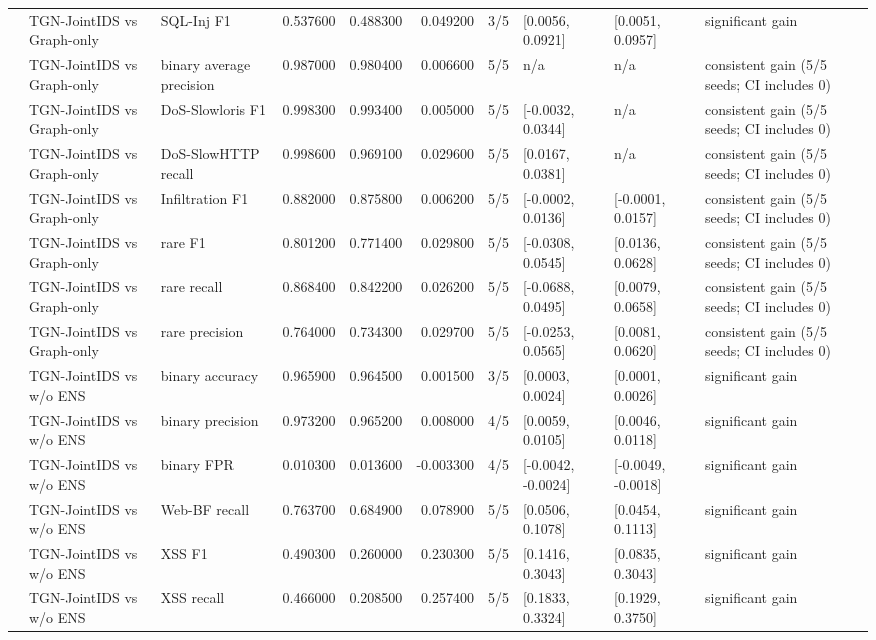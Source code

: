 \begin{table}
\begin{tabular}{lllrrrllll}
 & TGN-JointIDS vs Graph-only & SQL-Inj F1 & 0.537600 & 0.488300 & 0.049200 & 3/5 & [0.0056, 0.0921] & [0.0051, 0.0957] & significant gain \\
 & TGN-JointIDS vs Graph-only & binary average precision & 0.987000 & 0.980400 & 0.006600 & 5/5 & n/a & n/a & consistent gain (5/5 seeds; CI includes 0) \\
 & TGN-JointIDS vs Graph-only & DoS-Slowloris F1 & 0.998300 & 0.993400 & 0.005000 & 5/5 & [-0.0032, 0.0344] & n/a & consistent gain (5/5 seeds; CI includes 0) \\
 & TGN-JointIDS vs Graph-only & DoS-SlowHTTP recall & 0.998600 & 0.969100 & 0.029600 & 5/5 & [0.0167, 0.0381] & n/a & consistent gain (5/5 seeds; CI includes 0) \\
 & TGN-JointIDS vs Graph-only & Infiltration F1 & 0.882000 & 0.875800 & 0.006200 & 5/5 & [-0.0002, 0.0136] & [-0.0001, 0.0157] & consistent gain (5/5 seeds; CI includes 0) \\
 & TGN-JointIDS vs Graph-only & rare F1 & 0.801200 & 0.771400 & 0.029800 & 5/5 & [-0.0308, 0.0545] & [0.0136, 0.0628] & consistent gain (5/5 seeds; CI includes 0) \\
 & TGN-JointIDS vs Graph-only & rare recall & 0.868400 & 0.842200 & 0.026200 & 5/5 & [-0.0688, 0.0495] & [0.0079, 0.0658] & consistent gain (5/5 seeds; CI includes 0) \\
 & TGN-JointIDS vs Graph-only & rare precision & 0.764000 & 0.734300 & 0.029700 & 5/5 & [-0.0253, 0.0565] & [0.0081, 0.0620] & consistent gain (5/5 seeds; CI includes 0) \\
 & TGN-JointIDS vs w/o ENS & binary accuracy & 0.965900 & 0.964500 & 0.001500 & 3/5 & [0.0003, 0.0024] & [0.0001, 0.0026] & significant gain \\
 & TGN-JointIDS vs w/o ENS & binary precision & 0.973200 & 0.965200 & 0.008000 & 4/5 & [0.0059, 0.0105] & [0.0046, 0.0118] & significant gain \\
 & TGN-JointIDS vs w/o ENS & binary FPR & 0.010300 & 0.013600 & -0.003300 & 4/5 & [-0.0042, -0.0024] & [-0.0049, -0.0018] & significant gain \\
 & TGN-JointIDS vs w/o ENS & Web-BF recall & 0.763700 & 0.684900 & 0.078900 & 5/5 & [0.0506, 0.1078] & [0.0454, 0.1113] & significant gain \\
 & TGN-JointIDS vs w/o ENS & XSS F1 & 0.490300 & 0.260000 & 0.230300 & 5/5 & [0.1416, 0.3043] & [0.0835, 0.3043] & significant gain \\
 & TGN-JointIDS vs w/o ENS & XSS recall & 0.466000 & 0.208500 & 0.257400 & 5/5 & [0.1833, 0.3324] & [0.1929, 0.3750] & significant gain \\

\end{tabular}
\end{table}
